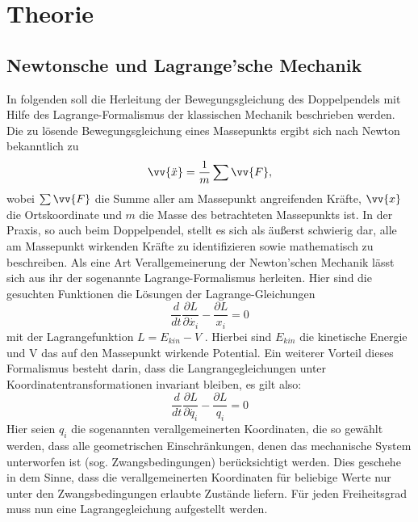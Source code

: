 \section{Theorie}
\subsection{Newtonsche und Lagrange'sche Mechanik}
In folgenden soll die Herleitung der Bewegungsgleichung des Doppelpendels mit Hilfe des Lagrange-Formalismus der klassischen Mechanik beschrieben werden. \\
Die zu lösende Bewegungsgleichung eines Massepunkts ergibt sich nach Newton bekanntlich zu \begin{equation}
\vv{\ddot{x}}=\frac{1}{m}\sum \vv{F},
\end{equation} 
wobei $ \sum \vv{F} $ die Summe aller am Massepunkt angreifenden Kräfte, $\vv{x} $ die Ortskoordinate und $ m $ die Masse des betrachteten Massepunkts ist.
In der Praxis, so auch beim Doppelpendel, stellt es sich als äußerst schwierig dar, alle am Massepunkt wirkenden Kräfte zu identifizieren sowie mathematisch zu beschreiben. Als eine Art Verallgemeinerung der Newton'schen Mechanik lässt sich aus ihr der sogenannte Lagrange-Formalismus herleiten. Hier sind die gesuchten Funktionen die Lösungen der Lagrange-Gleichungen
\begin{equation}
\frac{d}{dt}\frac{\partial L}{\partial\dot{x_i}}-\frac{\partial L}{x_i} = 0
\end{equation}
mit der Lagrangefunktion  $ L=E_{kin} - V $ . Hierbei sind $E_{kin}$ die kinetische Energie und V das auf den Massepunkt wirkende Potential. Ein weiterer Vorteil dieses Formalismus besteht darin, dass die Langrangegleichungen unter Koordinatentransformationen invariant bleiben, es gilt also:
\begin{equation}
\frac{d}{dt}\frac{\partial L}{\partial\dot{q_i}}-\frac{\partial L}{q_i} = 0
\label{lagrangegl}
\end{equation}
Hier seien $q_i$ die sogenannten verallgemeinerten Koordinaten, die so gewählt werden, dass alle geometrischen Einschränkungen, denen das mechanische System unterworfen ist (sog. Zwangsbedingungen) berücksichtigt werden. Dies geschehe in dem Sinne, dass die verallgemeinerten Koordinaten für beliebige Werte nur unter den Zwangsbedingungen erlaubte Zustände liefern. Für jeden Freiheitsgrad muss nun eine Lagrangegleichung aufgestellt werden.
